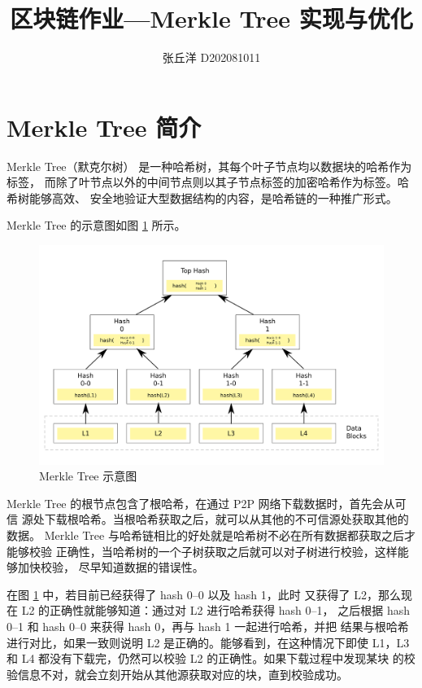 \documentclass{mydoc}
\title{\dabiaosong 区块链作业---Merkle Tree 实现与优化}
\author{张丘洋 D202081011}
\begin{document}
\maketitle

\section{Merkle Tree 简介}

Merkle Tree（默克尔树） 是一种哈希树，其每个叶子节点均以数据块的哈希作为标签，
而除了叶节点以外的中间节点则以其子节点标签的加密哈希作为标签。哈希树能够高效、
安全地验证大型数据结构的内容，是哈希链的一种推广形式。

Merkle Tree 的示意图如图 \ref{fig:merkle-tree} 所示。

\begin{figure}[htbp]
  \centering
  \includegraphics[width=\textwidth]{figure/MerkleTree.png}
  \begin{minipage}{\textwidth}
  \caption[Merkle Tree 示意图]{Merkle Tree 示意图\footnotemark}%
  \label{fig:merkle-tree}
  \end{minipage}
\end{figure}


Merkle Tree 的根节点包含了根哈希，在通过 P2P 网络下载数据时，首先会从可信
源处下载根哈希。当根哈希获取之后，就可以从其他的不可信源处获取其他的数据。
Merkle Tree 与哈希链相比的好处就是哈希树不必在所有数据都获取之后才能够校验
正确性，当哈希树的一个子树获取之后就可以对子树进行校验，这样能够加快校验，
尽早知道数据的错误性。

在图 \ref{fig:merkle-tree} 中，若目前已经获得了 hash 0--0 以及 hash 1，此时
又获得了 L2，那么现在 L2 的正确性就能够知道：通过对 L2 进行哈希获得 hash 0--1，
之后根据 hash 0--1 和 hash 0--0 来获得 hash 0，再与 hash 1 一起进行哈希，并把
结果与根哈希进行对比，如果一致则说明 L2 是正确的。能够看到，在这种情况下即使
L1，L3 和 L4 都没有下载完，仍然可以校验 L2 的正确性。如果下载过程中发现某块
的校验信息不对，就会立刻开始从其他源获取对应的块，直到校验成功。
\end{document}

